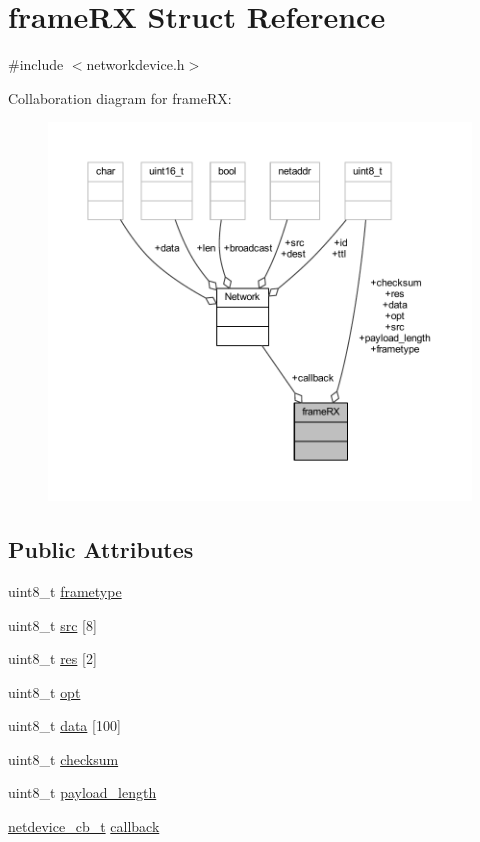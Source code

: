 \hypertarget{structframe_r_x}{}\section{frame\+RX Struct Reference}
\label{structframe_r_x}


{\ttfamily \#include $<$networkdevice.\+h$>$}



Collaboration diagram for frame\+RX\+:\nopagebreak
\begin{figure}[H]
\begin{center}
\leavevmode
\includegraphics[width=350pt]{structframe_r_x__coll__graph}
\end{center}
\end{figure}
\subsection*{Public Attributes}
\begin{DoxyCompactItemize}
\item 
uint8\+\_\+t \hyperlink{structframe_r_x_a4684f3a419d7c6eaf5bded40cec73cdf}{frametype}
\item 
uint8\+\_\+t \hyperlink{structframe_r_x_a4a465dedf00b5d81f2f337c987b0ce96}{src} \mbox{[}8\mbox{]}
\item 
uint8\+\_\+t \hyperlink{structframe_r_x_a339160d2b3a24b3db0ea4318fc36227c}{res} \mbox{[}2\mbox{]}
\item 
uint8\+\_\+t \hyperlink{structframe_r_x_a46a068d1f1deb22e9e415b1ced537516}{opt}
\item 
uint8\+\_\+t \hyperlink{structframe_r_x_afdb061e4b3b406bf4890e95de2fbf474}{data} \mbox{[}100\mbox{]}
\item 
uint8\+\_\+t \hyperlink{structframe_r_x_a2ef590f48976b2550c7e12f2accf1e2f}{checksum}
\item 
uint8\+\_\+t \hyperlink{structframe_r_x_a8ffb1ad18c41d6943c8172042f965123}{payload\+\_\+length}
\item 
\hyperlink{networkdevice_8h_a277c582bc58d68b7ff8ac21b18eac041}{netdevice\+\_\+cb\+\_\+t} \hyperlink{structframe_r_x_aa796fd31dd4da27a9a07e3d7cdd1239f}{callback}
\end{DoxyCompactItemize}


